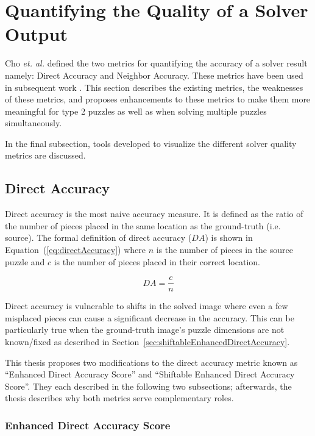 \documentclass{report}
\def\eref#1{(\ref{#1})}
\begin{document}
\pagebreak
\section{Quantifying the Quality of a Solver Output}\label{sec:quantifyingSolverQuantify}

Cho \textit{et. al.} \cite{cho2010} defined the two metrics for quantifying the accuracy of a solver result namely: Direct Accuracy and Neighbor Accuracy. These metrics have been used in subsequent work \cite{sholomon2013, pomeranz2011, paikin2015, son2014, gallagher2012}.  This section describes the existing metrics, the weaknesses of these metrics, and proposes enhancements to these metrics to make them more meaningful for type 2 puzzles as well as when solving multiple puzzles simultaneously.

In the final subsection, tools developed to visualize the different solver quality metrics are discussed.

\subsection{Direct Accuracy}\label{sec:directAccuracy}

Direct accuracy is the most naive accuracy measure.  It is defined as the ratio of the number of pieces placed in the same location as the ground-truth (i.e. source).  The formal definition of direct accuracy ($DA$) is shown in Equation~\eref{eq:directAccuracy} where $n$ is the number of pieces in the source puzzle and $c$ is the number of pieces placed in their correct location.

\begin{equation} \label{eq:directAccuracy}
DA = \frac{c}{n}
\end{equation}

Direct accuracy is vulnerable to shifts in the solved image where even a few misplaced pieces can cause a significant decrease in the accuracy.  This can be particularly true when the ground-truth image's puzzle dimensions are not known/fixed as described in Section~\ref{sec:shiftableEnhancedDirectAccuracy}.

This thesis proposes two modifications to the direct accuracy metric known as ``Enhanced Direct Accuracy Score'' and ``Shiftable Enhanced Direct Accuracy Score''.  They each described in the following two subsections; afterwards, the thesis describes why both metrics serve complementary roles.

\subsubsection{Enhanced Direct Accuracy Score}\label{sec:enhancedDirectAccuracyScore}
\end{document}
